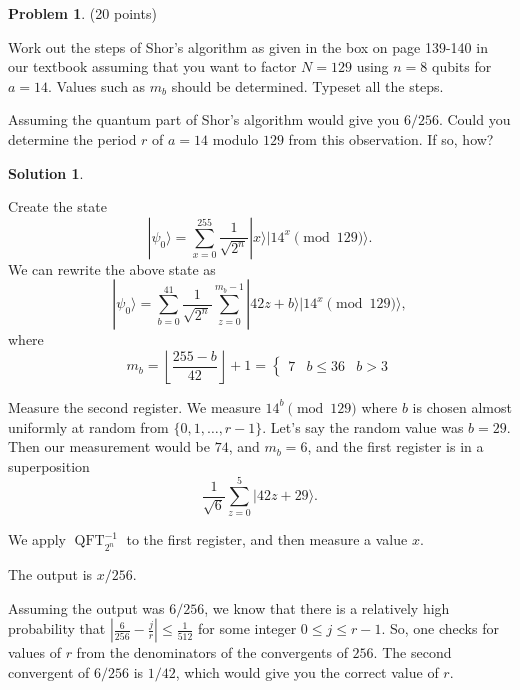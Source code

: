 \documentclass{article}
\theoremstyle{definition}
\newtheorem{problem}{Problem}
\newtheorem*{solution}{Solution}
\DeclareMathOperator{\QFT}{QFT}
\newcommand{\ket}[1]{|#1\rangle}
\begin{document}
\begin{problem} (20 points)
\begin{compactenum}[(a)]
\item Work out the steps of Shor's algorithm as given in the box on page 139-140 in our textbook assuming that you want to factor $N=129$ using $n=8$ qubits for $a=14$. Values such as $m_b$ should be determined. Typeset all the steps. 
\item Assuming the quantum part of Shor's algorithm would give you $6/256$. Could you determine the period $r$ of $a=14$ modulo $129$ from this observation. If so, how? 
\end{compactenum}
\end{problem}
\begin{solution}
\begin{compactenum}[1.]
\item Create the state 
$$ \ket{\psi_0} = \sum_{x = 0}^{255} \frac{1}{\sqrt{2^n}} \ket{x} \ket{14^x \pmod{129}}. $$
We can rewrite the above state as
$$ \ket{\psi_0} = \sum_{b = 0}^{41} \frac{1}{\sqrt{2^n}} \sum_{z=0}^{m_b-1} \ket{42 z + b} \ket{14^x \pmod{129}}, $$
where $$m_b  = \left \lfloor \frac{255 - b  }{42} \right \rfloor + 1 = 
\begin{cases}
7 & b \le 3
6 & b > 3
\end{cases}
$$
\item Measure the second register.  We measure $14^b \pmod{129}$ where $b$ is chosen almost uniformly at random from $\{0, 1, \ldots, r-1\}$.  Let's say the random value
was $b = 29$.  Then our measurement would be $74$, and $m_b = 6$, and the first register is in a superposition
$$\frac{1}{\sqrt 6} \sum_{z = 0}^5 \ket{42z + 29}.$$

\item We apply $\QFT_{2^n}^{-1}$ to the first register, and then measure a value $x$.  
\item The output is $x/256$. 
\end{compactenum}
Assuming the output was $6/256$, we know that there is a relatively high probability that $\left| \frac{6}{256} - \frac{j}{r} \right| \le \frac{1}{512}$ for some integer $0 \le j \le r-1$.  So, one checks for values of $r$ from the denominators of the convergents of $256$. The second convergent of $6/256$ is $1/42$, which would give you the correct value of $r$.
\end{solution}
\end{document}
